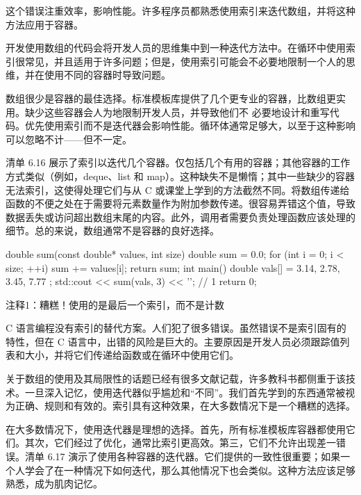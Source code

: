 这个错误注重效率，影响性能。许多程序员都熟悉使用索引来迭代数组，并将这种方法应用于容器。


开发使用数组的代码会将开发人员的思维集中到一种迭代方法中。在循环中使用索引很常见，并且适用于许多问题；但是，使用索引可能会不必要地限制一个人的思维，并在使用不同的容器时导致问题。

数组很少是容器的最佳选择。标准模板库提供了几个更专业的容器，比数组更实用。缺少这些容器会人为地限制开发人员，并导致他们不 必要地设计和重写代码。优先使用索引而不是迭代器会影响性能。循环体通常足够大，以至于这种影响可以忽略不计——但不一定。

清单 6.16 展示了索引以迭代几个容器。仅包括几个有用的容器；其他容器的工作方式类似（例如，deque、list 和 map）。这种缺失不是懒惰；其中一些缺少的容器无法索引，这使得处理它们与从 C 或课堂上学到的方法截然不同。将数组传递给函数的不便之处在于需要将元素数量作为附加参数传递。很容易弄错这个值，导致数据丢失或访问超出数组末尾的内容。此外，调用者需要负责处理函数应该处理的细节。总的来说，数组通常不是容器的良好选择。


\begin{cpp}
double sum(const double* values, int size) {
  double sum = 0.0;
  for (int i = 0; i < size; ++i)
    sum += values[i];
  return sum;
}
int main() {
  double vals[] = { 3.14, 2.78, 3.45, 7.77 };
  std::cout << sum(vals, 3) << '\n'; // 1
  return 0;
}
\end{cpp}

{\footnotesize
注释1：糟糕！使用的是最后一个索引，而不是计数
}


C 语言编程没有索引的替代方案。人们犯了很多错误。虽然错误不是索引固有的特性，但在 C 语言中，出错的风险是巨大的。主要原因是开发人员必须跟踪值列表和大小，并将它们传递给函数或在循环中使用它们。

关于数组的使用及其局限性的话题已经有很多文献记载，许多教科书都侧重于该技术。一旦深入记忆，使用迭代器似乎尴尬和“不同”。我们首先学到的东西通常被视为正确、规则和有效的。索引具有这种效果，在大多数情况下是一个糟糕的选择。


在大多数情况下，使用迭代器是理想的选择。首先，所有标准模板库容器都使用它们。其次，它们经过了优化，通常比索引更高效。第三，它们不允许出现差一错误。清单 6.17 演示了使用各种容器的迭代器。它们提供的一致性很重要；如果一个人学会了在一种情况下如何迭代，那么其他情况下也会类似。这种方法应该足够熟悉，成为肌肉记忆。

